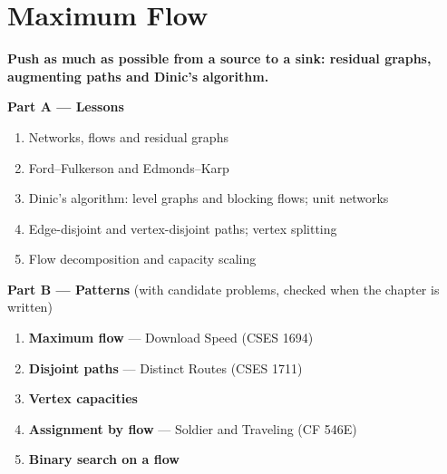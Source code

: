 \chapter{Maximum Flow}
\label{ch:max_flow}

\begin{tcolorbox}[enhanced, colback=white, colframe=secondaryblue, boxrule=1pt, arc=2mm]
\textbf{\large\textcolor{primaryblue}{Push as much as possible from a source to a sink: residual graphs, augmenting paths and Dinic's algorithm.}}
\end{tcolorbox}


\begin{plannedbox}
\textbf{Part A --- Lessons}
\begin{enumerate}[leftmargin=*, label=\textbf{A\arabic*.}, itemsep=1pt]
    \item Networks, flows and residual graphs
    \item Ford--Fulkerson and Edmonds--Karp
    \item Dinic's algorithm: level graphs and blocking flows; unit networks
    \item Edge-disjoint and vertex-disjoint paths; vertex splitting
    \item Flow decomposition and capacity scaling
\end{enumerate}
\textbf{Part B --- Patterns} (with candidate problems, checked when the chapter is written)
\begin{enumerate}[leftmargin=*, label=\textbf{P\arabic*.}, itemsep=1pt]
    \item \textbf{Maximum flow} --- Download Speed {\small\color{darkgray}(CSES 1694)}
    \item \textbf{Disjoint paths} --- Distinct Routes {\small\color{darkgray}(CSES 1711)}
    \item \textbf{Vertex capacities}
    \item \textbf{Assignment by flow} --- Soldier and Traveling {\small\color{darkgray}(CF 546E)}
    \item \textbf{Binary search on a flow}
\end{enumerate}
\end{plannedbox}

